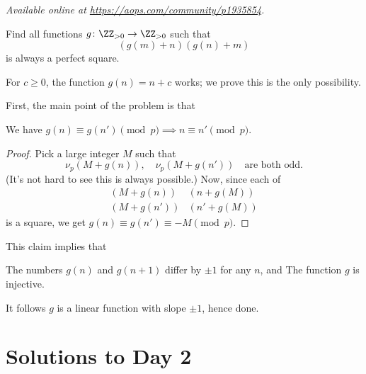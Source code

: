 \textsl{Available online at \url{https://aops.com/community/p1935854}.}
\begin{mdframed}[style=mdpurplebox,frametitle={Problem statement}]
Find all functions $g \colon \ZZ_{>0} \to \ZZ_{>0}$ such that
\[ \left( g(m)+n \right)\left( g(n)+m \right) \]
is always a perfect square.
\end{mdframed}
For $c \ge 0$, the function $g(n) = n+c$ works;
we prove this is the only possibility.

First, the main point of the problem is that
\begin{claim*}
  We have
  $g(n) \equiv g(n') \pmod p \implies n \equiv n' \pmod p$.
\end{claim*}
\begin{proof}
  Pick a large integer $M$ such that
  \[ \nu_p(M+g(n)), \quad \nu_p(M+g(n')) \quad
    \text{are both odd}. \]
  (It's not hard to see this is always possible.)
  Now, since each of
  \begin{align*}
    \left( M + g(n) \right)&\left( n + g(M)  \right) \\
    \left( M + g(n') \right)&\left( n' + g(M)  \right)
  \end{align*}
  is a square, we get $g(n) \equiv g(n') \equiv -M \pmod p$.
\end{proof}

This claim implies that
\begin{itemize}
  \ii The numbers $g(n)$ and $g(n+1)$ differ by $\pm 1$ for any $n$, and
  \ii The function $g$ is injective.
\end{itemize}
It follows $g$ is a linear function with slope $\pm 1$, hence done.
\pagebreak

\section{Solutions to Day 2}